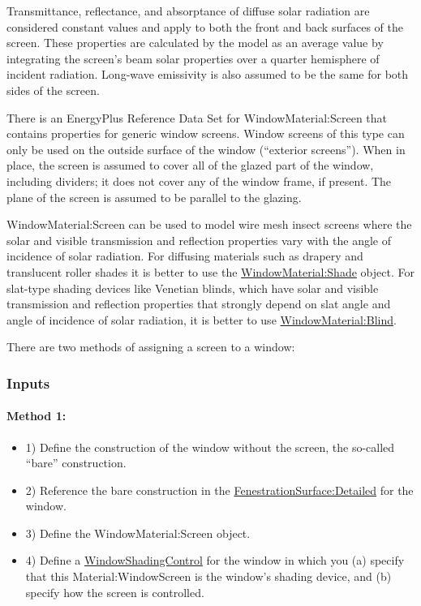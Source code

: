 Transmittance, reflectance, and absorptance of diffuse solar radiation are considered constant values and apply to both the front and back surfaces of the screen. These properties are calculated by the model as an average value by integrating the screen's beam solar properties over a quarter hemisphere of incident radiation. Long-wave emissivity is also assumed to be the same for both sides of the screen.

There is an EnergyPlus Reference Data Set for WindowMaterial:Screen that contains properties for generic window screens. Window screens of this type can only be used on the outside surface of the window (``exterior screens''). When in place, the screen is assumed to cover all of the glazed part of the window, including dividers; it does not cover any of the window frame, if present. The plane of the screen is assumed to be parallel to the glazing.

WindowMaterial:Screen can be used to model wire mesh insect screens where the solar and visible transmission and reflection properties vary with the angle of incidence of solar radiation. For diffusing materials such as drapery and translucent roller shades it is better to use the \hyperref[windowmaterialshade]{WindowMaterial:Shade} object. For slat-type shading devices like Venetian blinds, which have solar and visible transmission and reflection properties that strongly depend on slat angle and angle of incidence of solar radiation, it is better to use \hyperref[windowmaterialblind]{WindowMaterial:Blind}.

There are two methods of assigning a screen to a window:

\subsubsection{Inputs}\label{inputs-25-003}

\paragraph{Method 1:}\label{method-1-2}
\begin{itemize}
\item 1) Define the construction of the window without the screen, the so-called ``bare'' construction.

\item 2) Reference the bare construction in the \hyperref[fenestrationsurfacedetailed]{FenestrationSurface:Detailed} for the window.

\item 3) Define the WindowMaterial:Screen object.

\item 4) Define a \hyperref[windowpropertyshadingcontrol]{WindowShadingControl} for the window in which you (a) specify that this Material:WindowScreen is the window's shading device, and (b) specify how the screen is controlled.

\end{itemize}


